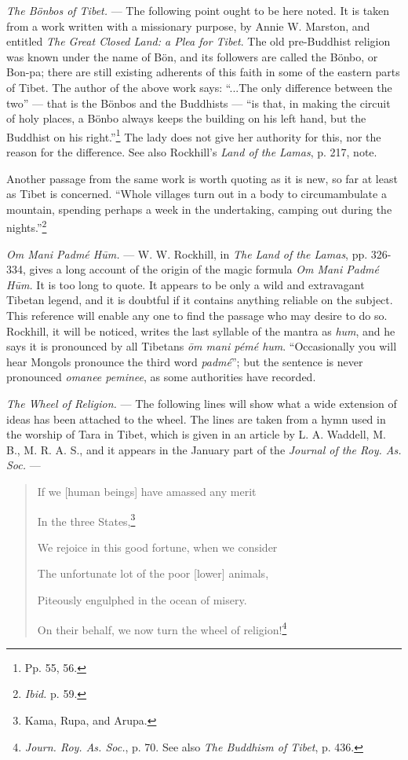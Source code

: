 \documentclass[a4paper, 11pt, oneside, polutonikogreek, english]{article}
\begin{document}
\emph{The Bönbos of Tibet.} --- The following point ought to be here noted. It is taken from a work written with a missionary purpose, by Annie W. Marston, and entitled \emph{The Great Closed Land: a Plea for Tibet}. The old pre-Buddhist religion was known under the name of Bön, and its followers are called the Bönbo, or Bon-pa; there are still existing adherents of this faith in some of the eastern parts of Tibet. The author of the above work says: ``...The only difference between the two'' --- that is the Bönbos and the Buddhists --- ``is that, in making the circuit of holy places, a Bönbo always keeps the building on his left hand, but the Buddhist on his right.''\footnote{Pp. 55, 56.} The lady does not give her authority for this, nor the reason for the difference. See also Rockhill's \emph{Land of the Lamas}, p. 217, note.

Another passage from the same work is worth quoting as it is new, so far at least as Tibet is concerned. ``Whole villages turn out in a body to circumambulate a mountain, spending perhaps a week in the undertaking, camping out during the nights.''\footnote{\emph{Ibid.} p. 59.}

\emph{Om Mani Padmé Hūm.} --- W. W. Rockhill, in \emph{The Land of the Lamas}, 
pp. 326-334, gives a long account of the origin of the magic formula \emph{Om Mani Padmé Hūm.} It is too long to quote. It appears to be only a wild 
and extravagant Tibetan legend, and it is doubtful if it contains anything reliable on the subject. This reference will enable any one to find the passage who may desire to do so. Rockhill, it will be noticed, writes the last syllable of the mantra as \emph{hum}, and he says it is pronounced by all Tibetans \emph{ōm mani pémé hum}. ``Occasionally you will hear Mongols pronounce the third word \emph{padmé}''; but the sentence is never pronounced \emph{omanee peminee}, as some authorities have recorded.

\emph{The Wheel of Religion.} --- The following lines will show what a wide extension of ideas has been attached to the wheel. The lines are taken from a hymn used in the worship of Tara in Tibet, which is given in an article by L. A. Waddell, M. B., M. R. A. S., and it appears in the January part of the \emph{Journal of the Roy. As. Soc.} ---

\begin{quotation}\small
If we [human beings] have amassed any merit

In the three States,\footnote{Kama, Rupa, and Arupa.}

We rejoice in this good fortune, when we consider

The unfortunate lot of the poor [lower] animals,

Piteously engulphed in the ocean of misery.

On their behalf, we now turn the wheel of religion!\footnote{\emph{Journ. Roy. As. Soc.}, p. 70. See also \emph{The Buddhism of Tibet}, p. 436.}
\end{quotation}
\end{document}
